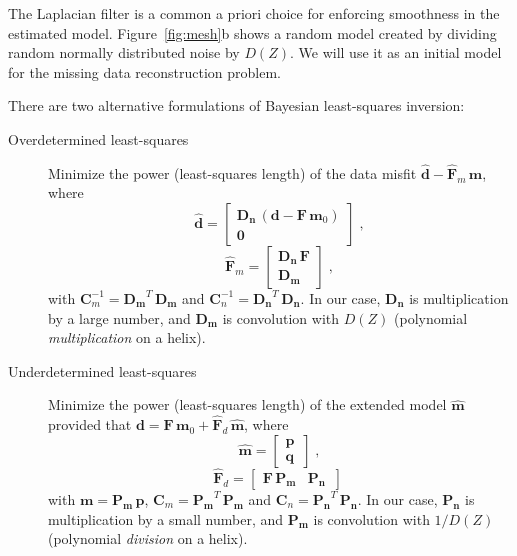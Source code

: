 
The Laplacian filter is a common a priori choice for enforcing
smoothness in the estimated model. Figure~\ref{fig:mesh}b shows a
random model created by dividing random normally distributed noise by
$D(Z)$. We will use it as an initial model for the missing data
reconstruction problem. 

There are two alternative formulations of Bayesian least-squares inversion:
\begin{description}
\item[Overdetermined least-squares] Minimize the power (least-squares length) of the data misfit $\widehat{\mathbf{d}} - \widehat{\mathbf{F}}_m\,\mathbf{m}$, where
\begin{equation}
\label{eq:dhat}
\widehat{\mathbf{d}} = \left[\begin{array}{l} \mathbf{D_n}\,\left(\mathbf{d} - \mathbf{F}\,\mathbf{m}_0\right) \\
\mathbf{0}\,\end{array}\right]\;,
\end{equation} 
\begin{equation}
\label{eq:fmhat}
\widehat{\mathbf{F}}_m = \left[\begin{array}{l} \mathbf{D_n}\,\mathbf{F} \\
\mathbf{D_m}\,\end{array}\right]\;,
\end{equation} 
with $\mathbf{C}_m^{-1} = \mathbf{D_m}^T\,\mathbf{D_m}$ and $\mathbf{C}_n^{-1} =
\mathbf{D_n}^T\,\mathbf{D_n}$. In our case, $\mathbf{D_n}$ is multiplication
by a large number, and $\mathbf{D_m}$ is convolution with $D(Z)$ (polynomial \emph{multiplication} on a helix).
\item[Underdetermined least-squares] Minimize the power (least-squares length) of the extended model $\widehat{\mathbf{m}}$ provided 
that $\mathbf{d} = \mathbf{F}\,\mathbf{m}_0 + \widehat{\mathbf{F}}_d\,\widehat{\mathbf{m}}$, where
\begin{equation}
\label{eq:mhat}
\widehat{\mathbf{m}} = \left[\begin{array}{l} \mathbf{p} \\
\mathbf{q}\,\end{array}\right]\;,
\end{equation} 
\begin{equation}
\label{eq:fdhat}
\widehat{\mathbf{F}}_d = \left[\begin{array}{cc} \mathbf{F}\,\mathbf{P_m} &
\mathbf{P_n}\,\end{array}\right]\;
\end{equation}
with $\mathbf{m} = \mathbf{P_m}\,\mathbf{p}$, $\mathbf{C}_m = \mathbf{P_m}^T\,\mathbf{P_m}$ and $\mathbf{C}_n =
\mathbf{P_n}^T\,\mathbf{P_n}$. In our case, $\mathbf{P_n}$ is multiplication
by a small number, and $\mathbf{P_m}$ is convolution with $1/D(Z)$ (polynomial \emph{division} on a helix).
\end{description}

